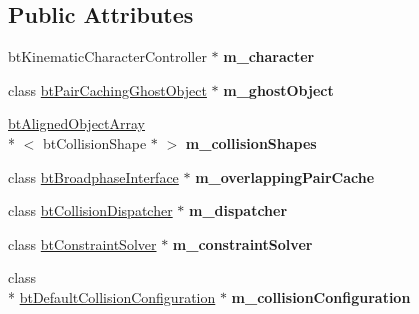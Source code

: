 \subsection*{Public Attributes}
\begin{DoxyCompactItemize}
\item 
\hypertarget{class_character_demo_ac37eecd41474abe460259fede92f5cb0}{bt\+Kinematic\+Character\+Controller $\ast$ {\bfseries m\+\_\+character}}\label{class_character_demo_ac37eecd41474abe460259fede92f5cb0}

\item 
\hypertarget{class_character_demo_ad4c1db315fae4d5b9b5ca846d7d04bc6}{class \hyperlink{classbt_pair_caching_ghost_object}{bt\+Pair\+Caching\+Ghost\+Object} $\ast$ {\bfseries m\+\_\+ghost\+Object}}\label{class_character_demo_ad4c1db315fae4d5b9b5ca846d7d04bc6}

\item 
\hypertarget{class_character_demo_ab84c0f00072cb19c8624469dec97500f}{\hyperlink{classbt_aligned_object_array}{bt\+Aligned\+Object\+Array}\\*
$<$ bt\+Collision\+Shape $\ast$ $>$ {\bfseries m\+\_\+collision\+Shapes}}\label{class_character_demo_ab84c0f00072cb19c8624469dec97500f}

\item 
\hypertarget{class_character_demo_a44655f68dc1c6cc135f42076553a8cbf}{class \hyperlink{classbt_broadphase_interface}{bt\+Broadphase\+Interface} $\ast$ {\bfseries m\+\_\+overlapping\+Pair\+Cache}}\label{class_character_demo_a44655f68dc1c6cc135f42076553a8cbf}

\item 
\hypertarget{class_character_demo_a790b4e7d24268f9f5ed5653578e6331d}{class \hyperlink{classbt_collision_dispatcher}{bt\+Collision\+Dispatcher} $\ast$ {\bfseries m\+\_\+dispatcher}}\label{class_character_demo_a790b4e7d24268f9f5ed5653578e6331d}

\item 
\hypertarget{class_character_demo_ab28a585cefabe9cb209e303b51b0175e}{class \hyperlink{classbt_constraint_solver}{bt\+Constraint\+Solver} $\ast$ {\bfseries m\+\_\+constraint\+Solver}}\label{class_character_demo_ab28a585cefabe9cb209e303b51b0175e}

\item 
\hypertarget{class_character_demo_aba44037cd6c392c4279b6d17ae27a9b9}{class \\*
\hyperlink{classbt_default_collision_configuration}{bt\+Default\+Collision\+Configuration} $\ast$ {\bfseries m\+\_\+collision\+Configuration}}\label{class_character_demo_aba44037cd6c392c4279b6d17ae27a9b9}


\end{DoxyCompactItemize}
